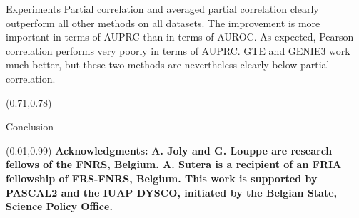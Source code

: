 \documentclass[final]{beamer}
\begin{document}
\begin{frame}{}
\begin{textblock}{0.69}
\begin{block}{Experiments \phantom{p}}
Partial correlation and averaged partial correlation clearly outperform all other methods on all datasets. The
improvement is more important in terms of AUPRC than in terms of AUROC. As
expected, Pearson correlation performs very poorly in terms of AUPRC. GTE and
GENIE3 work much better, but these two methods are nevertheless clearly below
partial correlation.

\end{block}

\end{textblock}




\begin{textblock}{0.28}(0.71,0.78)

\begin{block}{Conclusion \phantom{p}}
\vspace{-0.4cm}
\begin{center}

\begin{minipage}{0.95\linewidth}
\end{minipage}
\end{center}

\vspace{-0.3cm}

\end{block}

\end{textblock}

\begin{textblock}{1}(0.01,0.99)
{\fontsize{12}{10}\textbf{Acknowledgments:}}
{\fontsize{8}{10}\textbf{A. Joly and G. Louppe are research fellows of the FNRS, Belgium. A. Sutera is a
recipient of an FRIA fellowship of FRS-FNRS, Belgium. This work is supported by
PASCAL2 and the IUAP DYSCO, initiated by the Belgian State, Science Policy
Office.}}
\end{textblock}

\end{frame}
\end{document}
